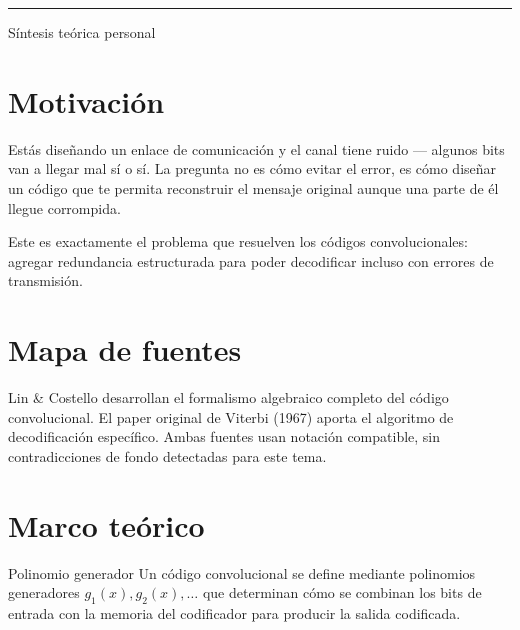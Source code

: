 \documentclass[11pt,openany]{book}
\begin{document}
\begin{titlepage}
  \centering
  \vspace*{4cm}
  {\fontsize{22}{26}\selectfont\bfseries\color{textgray} \materiaActual \par}
  \vspace{0.5cm}
  {\large\color{rulegray}\rule{0.85\linewidth}{0.4pt}\par}
  \vspace{1cm}
  {\large\color{textgray} Síntesis teórica personal \par}
\end{titlepage}

\tableofcontents


\section{Motivación}
\begin{motivacion}
Estás diseñando un enlace de comunicación y el canal tiene ruido — algunos bits van a llegar mal sí o sí. La pregunta no es cómo evitar el error, es cómo diseñar un código que te permita reconstruir el mensaje original aunque una parte de él llegue corrompida.
\end{motivacion}

Este es exactamente el problema que resuelven los códigos convolucionales: agregar redundancia estructurada para poder decodificar incluso con errores de transmisión.

\section{Mapa de fuentes}
Lin \& Costello desarrollan el formalismo algebraico completo del código convolucional. El paper original de Viterbi (1967) aporta el algoritmo de decodificación específico. Ambas fuentes usan notación compatible, sin contradicciones de fondo detectadas para este tema.

\section{Marco teórico}

\begin{bloque}{Polinomio generador}
Un código convolucional se define mediante polinomios generadores $g_1(x), g_2(x), \ldots$ que determinan cómo se combinan los bits de entrada con la memoria del codificador para producir la salida codificada.
\end{bloque}
\end{document}
